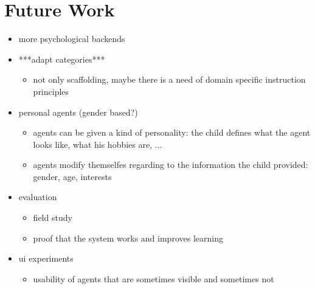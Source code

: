 \section{Future Work}
\label{future_work}

\begin{itemize}
\item more psychological backends
\item ***adapt categories***

\begin{itemize}
\item not only scaffolding, maybe there is a need of domain specific instruction
principles
\end{itemize}
\item personal agents (gender based?)

\begin{itemize}
\item agents can be given a kind of personality: the child defines what
the agent looks like, what his hobbies are, ...
\item agents modify themselfes regarding to the information the child provided:
gender, age, interests
\end{itemize}
\item evaluation

\begin{itemize}
\item field study
\item proof that the system works and improves learning
\end{itemize}
\item ui experiments

\begin{itemize}
\item usability of agents that are sometimes visible and sometimes not
\end{itemize}
\end{itemize}
